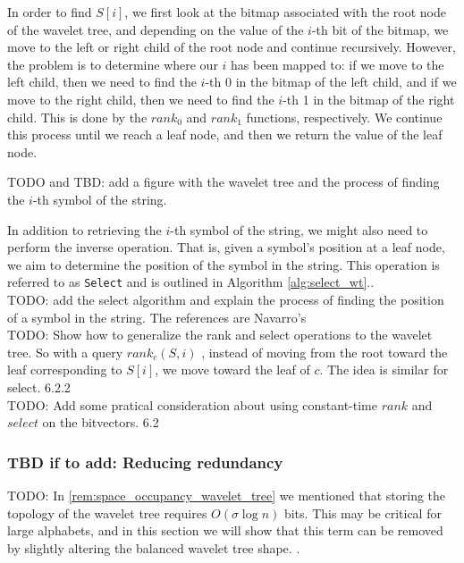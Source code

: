 \noindent In order to find $S[i]$, we first look at the bitmap associated with the root node of the wavelet tree, and depending on the value of the $i$-th bit of the bitmap, we move to the left or right child of the root node and continue recursively. However, the problem is to determine where our $i$ has been mapped to: if we move to the left child, then we need to find the $i$-th 0 in the bitmap of the left child, and if we move to the right child, then we need to find the $i$-th 1 in the bitmap of the right child. This is done by the $rank_0$ and $rank_1$ functions, respectively. We continue this process until we reach a leaf node, and then we return the value of the leaf node.

\begin{example}
    TODO and TBD: add a figure with the wavelet tree and the process of finding the $i$-th symbol of the string.
\end{example}

\noindent In addition to retrieving the $i$-th symbol of the string, we might also need to perform the inverse operation. That is, given a symbol's position at a leaf node, we aim to determine the position of the symbol in the string. This operation is referred to as \texttt{Select} and is outlined in Algorithm \ref{alg:select_wt}..\\

\noindent TODO: add the select algorithm and explain the process of finding the position of a symbol in the string. The references are Navarro's \cite{WTForALL,navarro2016compact} \\

\noindent TODO: Show how to generalize the rank and select operations to the wavelet tree. So with a query $rank_c(S,i)$ , instead of moving from the root toward the leaf corresponding to $S[i]$, we move toward the leaf of $c$. The idea is similar for select. \cite{navarro2016compact} 6.2.2 \\

\noindent TODO: Add some pratical consideration about using constant-time $rank$ and $select$ on the bitvectors. \cite{navarro2016compact} 6.2

\subsubsection*{TBD if to add: Reducing redundancy}
TODO: In \ref{rem:space_occupancy_wavelet_tree} we mentioned that storing the topology of the wavelet tree requires $O(\sigma \log n)$ bits. This may be critical for large alphabets, and in this section we will show that this term can be removed by slightly altering the balanced wavelet tree shape. \cite{MAKINEN2007332,MAKINEN2006703}.

